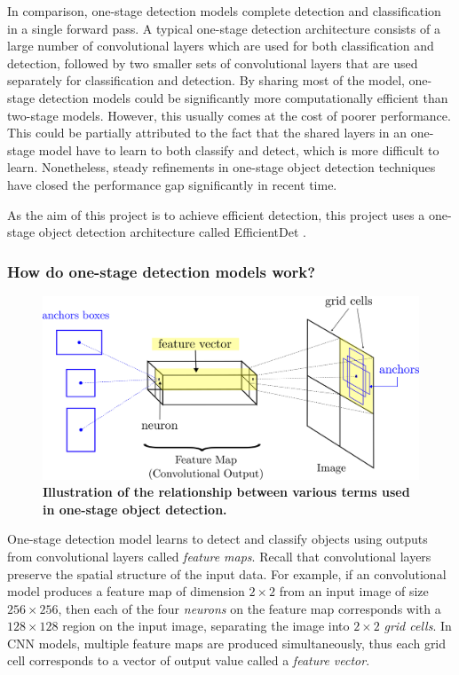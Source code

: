 \documentclass[12pt,a4paper,twoside,openany]{report}
\begin{document}
In comparison, one-stage detection models complete detection and classification in a single forward pass. A typical one-stage detection architecture consists of a large number of convolutional layers which are used for both classification and detection, followed by two smaller sets of convolutional layers that are used separately for classification and detection. 
By sharing most of the model, one-stage detection models could be significantly more computationally efficient than two-stage models. However, this usually comes at the cost of poorer performance. This could be partially attributed to the fact that the shared layers in an one-stage model have to learn to both classify and detect, which is more difficult to learn. Nonetheless, steady refinements in one-stage object detection techniques have closed the performance gap significantly in recent time. 

As the aim of this project is to achieve efficient detection, this project uses a one-stage object detection architecture called EfficientDet \cite{tan_efficientdet_2020}.

\subsubsection{How do one-stage detection models work?} \label{section:one_stage}
\begin{figure}[H]
    \centering
    \includegraphics{figs/prep/anchor_box.png}
    \caption{\textbf{Illustration of the relationship between various terms used in one-stage object detection.}}
    \label{fig:explain_anchors}
\end{figure}

One-stage detection model learns to detect and classify objects using outputs from convolutional layers called \textit{feature maps}. Recall that convolutional layers preserve the spatial structure of the input data. For example, if an convolutional model produces a feature map of dimension $2 \times 2$ from an input image of size $256 \times 256$, then each of the four \textit{neurons} on the feature map corresponds with a $128 \times 128$ region on the input image, separating the image into $2 \times 2$ \textit{grid cells}.
In CNN models, multiple feature maps are produced simultaneously, thus each grid cell corresponds to a vector of output value called a \textit{feature vector}.
\end{document}
